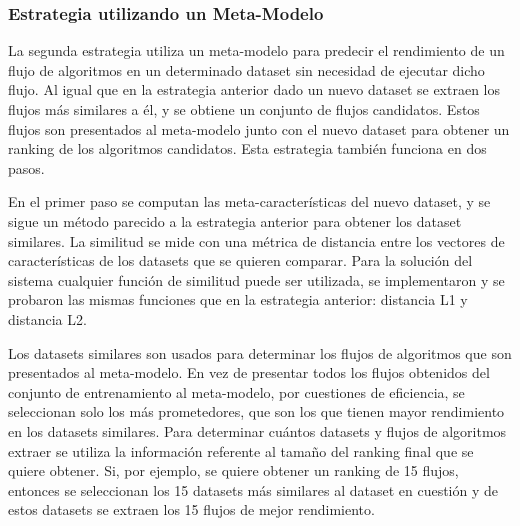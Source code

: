 \subsubsection{Estrategia utilizando un Meta-Modelo}\label{subsub:ranker}


La segunda estrategia utiliza un meta-modelo para predecir el rendimiento de un flujo de algoritmos en un determinado dataset sin necesidad de ejecutar dicho flujo. Al igual que en la estrategia anterior dado un nuevo dataset se extraen los flujos más similares a él, y se obtiene un conjunto de flujos candidatos. Estos flujos son presentados al meta-modelo junto con el nuevo dataset para obtener un ranking de los algoritmos candidatos. Esta estrategia también funciona en dos pasos.

En el primer paso se computan las meta-características del nuevo dataset, y se sigue un método parecido a la estrategia anterior para obtener los dataset similares. La similitud se mide con una métrica de distancia entre los vectores de características de los datasets que se quieren comparar. Para la solución del sistema cualquier función de similitud puede ser utilizada, se implementaron y se probaron las mismas funciones que en la estrategia anterior: distancia L1 y distancia L2.

Los datasets similares son usados para determinar los flujos de algoritmos que son presentados al meta-modelo. En vez de presentar todos los flujos obtenidos del conjunto de entrenamiento al meta-modelo, por cuestiones de eficiencia, se seleccionan solo los más prometedores, que son los que tienen mayor rendimiento en los datasets similares. Para determinar cuántos datasets y flujos de algoritmos extraer se utiliza la información referente al tamaño del ranking final que se quiere obtener. Si, por ejemplo, se quiere obtener un ranking de 15 flujos, entonces se seleccionan los 15 datasets más similares al dataset en cuestión y de estos datasets se extraen los 15 flujos de mejor rendimiento. 

